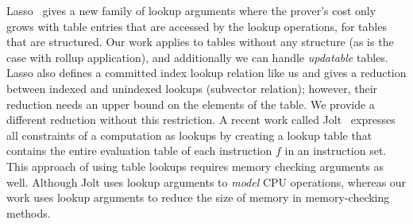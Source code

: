 
Lasso~\cite{lasso} gives a new family of lookup arguments where the prover's cost only grows with table entries that are
accessed by the lookup operations, for tables that are structured. Our work applies to tables without any structure (as is the case with rollup application), and additionally we can handle \emph{updatable}%
tables. Lasso also defines a committed index lookup relation like us and gives a reduction between indexed and unindexed lookups (subvector relation); however, their reduction needs an upper bound on the elements of the table. We provide a different reduction without this restriction. 
A recent work called Jolt~\cite{jolt} expresses all constraints of a computation as lookups by creating a lookup table that contains the entire evaluation table of each instruction $f$ in an instruction set.
This approach of using table lookups requires memory checking arguments as well. Although Jolt uses lookup arguments to \emph{model} CPU operations, whereas our work uses lookup arguments to reduce the size of memory in memory-checking methods. 

